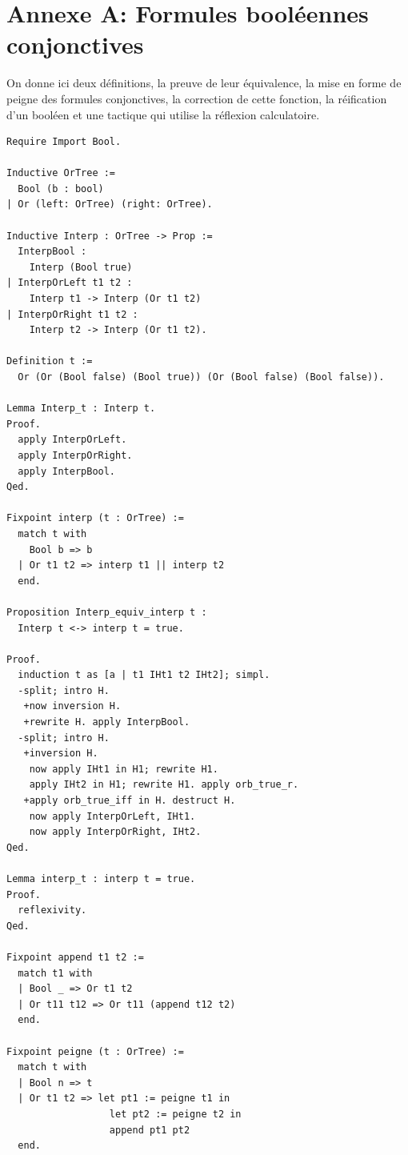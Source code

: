\documentclass[11pt]{article}
\begin{document}
\newpage
\renewcommand\refname{Bibliographie}
\nocite{*}
{}




\section*{Annexe A: Formules booléennes conjonctives}

On donne ici deux définitions, la preuve de leur équivalence, la mise en forme de peigne des formules conjonctives, la correction de cette fonction, la réification d'un booléen et une tactique qui utilise la réflexion calculatoire.

\begin{lstlisting}[frame=single]
Require Import Bool.

Inductive OrTree :=
  Bool (b : bool)
| Or (left: OrTree) (right: OrTree).

Inductive Interp : OrTree -> Prop :=
  InterpBool :
    Interp (Bool true) 
| InterpOrLeft t1 t2 :
    Interp t1 -> Interp (Or t1 t2) 
| InterpOrRight t1 t2 :
    Interp t2 -> Interp (Or t1 t2).

Definition t :=
  Or (Or (Bool false) (Bool true)) (Or (Bool false) (Bool false)).

Lemma Interp_t : Interp t.
Proof.
  apply InterpOrLeft.
  apply InterpOrRight.
  apply InterpBool.
Qed.

Fixpoint interp (t : OrTree) :=
  match t with
    Bool b => b
  | Or t1 t2 => interp t1 || interp t2
  end.

Proposition Interp_equiv_interp t :
  Interp t <-> interp t = true.

Proof.
  induction t as [a | t1 IHt1 t2 IHt2]; simpl.
  -split; intro H.
   +now inversion H.
   +rewrite H. apply InterpBool.
  -split; intro H.
   +inversion H.
    now apply IHt1 in H1; rewrite H1.
    apply IHt2 in H1; rewrite H1. apply orb_true_r.
   +apply orb_true_iff in H. destruct H.
    now apply InterpOrLeft, IHt1.
    now apply InterpOrRight, IHt2. 
Qed.

Lemma interp_t : interp t = true.
Proof.
  reflexivity.
Qed.

Fixpoint append t1 t2 :=
  match t1 with
  | Bool _ => Or t1 t2
  | Or t11 t12 => Or t11 (append t12 t2)
  end.

Fixpoint peigne (t : OrTree) :=
  match t with
  | Bool n => t
  | Or t1 t2 => let pt1 := peigne t1 in
                  let pt2 := peigne t2 in
                  append pt1 pt2
  end.


\end{lstlisting}
\end{document}
